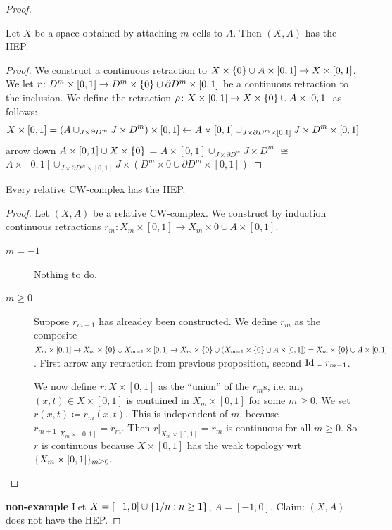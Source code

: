 \documentclass{TemplateLecture}
\begin{document}
\begin{proof}
    \begin{proposition}
        Let \(X\) be a space obtained by attaching \(m\)-cells to \(A\). Then \((X,A)\) has the HEP.
    \end{proposition}
    \begin{proof}
        We construct a continuous retraction to \(X\times \{0\} \cup A \times [0,1] \to X\times [0,1]\). We let \(r \colon D^m \times [0,1] \to D^m \times \{0\} \cup \partial D^m \times [0,1]\) be a continuous retraction to the inclusion.
        We define the retraction \(\rho\colon X \times [0,1] \to X \times \{0\} \cup A \times [0,1]\) as follows:
        \[X\times [0,1] = (A \cup_{J\times \partial D^m} J\times D^m) \times [0,1] \leftarrow A \times [0,1] \cup_{J\times \partial D^m \times [0,1]} J\times D^m \times [0,1]\]%
                arrow down
        \(A\times [0,1] \cup X\times \{0\}\) = \(A \times [0,1] \cup_{J\times \partial D^m} J\times D^m\) \(\cong\) \(A\times [0,1] \cup_{J\times \partial D^m \times [0,1]} J\times (D^m \times 0 \cup \partial D^m \times [0,1])\)
    \end{proof}

    \begin{thm}{}{}
        Every relative CW-complex has the HEP.
    \end{thm}
    \begin{proof}
        Let \((X,A)\) be a relative CW-complex. We construct by induction continuous retractions \(r_m\colon X_m \times [0,1] \to X_m \times 0 \cup A\times [0,1]\).
        \begin{description}
            \item[\(m = -1\)] Nothing to do.
            \item[\(m \geq 0\)] Suppose \(r_{m-1}\) has alreadey been constructed. We define \(r_m\) as the composite \(X_m \times [0,1] \to X_m \times \{0\} \cup X_{m-1} \times [0,1] \to X_m \times \{0\} \cup (X_{m-1} \times \{0\} \cup A \times [0,1]) = X_m \times \{0\} \cup A \times [0,1]\). First arrow any retraction from previous proposition, second \(\mathrm{Id} \cup r_{m-1}\).
            
            We now define \(r\colon X\times [0,1]\) as the \enquote{union} of the \(r_m\)s, i.e. any \((x,t) \in X\times [0,1]\) is contained in \(X_m \times [0,1]\) for some \(m \geq 0\). We set \(r(x,t) \coloneq r_m(x,t)\). This is independent of \(m\), because \(r_{m+1}\rvert_{X_m\times [0,1]} = r_m\). Then \(r\rvert_{X_m \times [0,1]} = r_m\) is continuous for all \(m \geq 0\). So \(r\) is continuous because \(X \times [0,1]\) has the weak topology wrt \(\{X_m \times [0,1]\}_{m \geq 0}\).
        \end{description}
    \end{proof}
    \textbf{non-example} Let \(X = [-1,0] \cup \{1/n : n \geq 1\}\), \(A = [-1, 0]\). Claim: \((X,A)\) does not have the HEP.


\end{proof}
\end{document}
